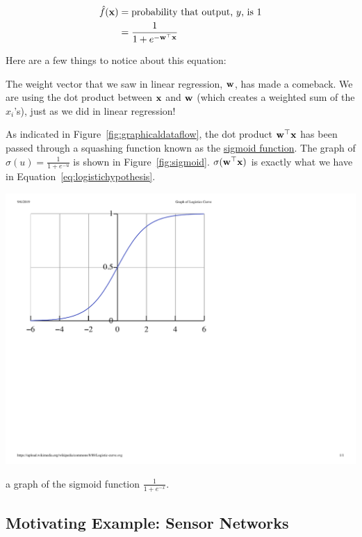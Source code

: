 \documentclass[assignment04_Solutions]{subfiles}
\begin{document}
\begin{align}
\hat{f}(\mathbf{x}) &= \mbox{probability that output, $y$, is 1} \nonumber \\
&=\frac{1}{1 + e^{-\mathbf{w}^\top \mathbf{x}}} \label{eq:logistichypothesis}
\end{align}

Here are a few things to notice about this equation:
\be
\item The weight vector that we saw in linear regression, $\mathbf{w}$, has made a comeback. We are using the dot product between $\mathbf{x}$ and $\mathbf{w}$ (which creates a weighted sum of the $x_i$'s), just as we did in linear regression!
\item As indicated in Figure~\ref{fig:graphicaldataflow}, the dot product $\mathbf{w}^\top \mathbf{x}$ has been passed through a squashing function known as the \href{https://en.wikipedia.org/wiki/Sigmoid_function}{sigmoid function}.  The graph of $\sigma(u) = \frac{1}{1+e^{-u}}$ is shown in Figure~\ref{fig:sigmoid}.  $\sigma( \mathbf{w}^\top \mathbf{x})$ is exactly what we have in Equation~\ref{eq:logistichypothesis}. 

\begin{marginfigure}
\includegraphics[width=\linewidth]{figures/Logistic-curve}
\caption{a graph of the sigmoid function $\frac{1}{1+e^{-x}}$.}\label{fig:sigmoid}
\end{marginfigure}
\ee

\subsection{Motivating Example: Sensor Networks}
\end{document}
